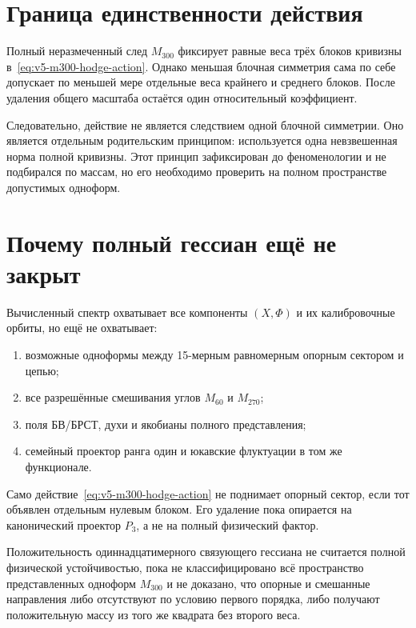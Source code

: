 \section{Граница единственности действия}

Полный неразмеченный след $M_{300}$ фиксирует равные веса трёх блоков
кривизны в~\eqref{eq:v5-m300-hodge-action}. Однако меньшая блочная симметрия
сама по себе допускает по меньшей мере отдельные веса крайнего и среднего
блоков. После удаления общего масштаба остаётся один относительный
коэффициент.

Следовательно, действие не является следствием одной блочной симметрии.
Оно является отдельным родительским принципом: используется одна
невзвешенная норма полной кривизны. Этот принцип зафиксирован до
феноменологии и не подбирался по массам, но его необходимо проверить на
полном пространстве допустимых одноформ.

\section{Почему полный гессиан ещё не закрыт}

Вычисленный спектр охватывает все компоненты $(X,\Phi)$ и их калибровочные
орбиты, но ещё не охватывает:
\begin{enumerate}
 \item возможные одноформы между 15-мерным равномерным опорным сектором и
 цепью;
 \item все разрешённые смешивания углов $M_{60}$ и $M_{270}$;
 \item поля БВ/БРСТ, духи и якобианы полного представления;
 \item семейный проектор ранга один и юкавские флуктуации в том же
 функционале.
\end{enumerate}
Само действие~\eqref{eq:v5-m300-hodge-action} не поднимает опорный сектор,
если тот объявлен отдельным нулевым блоком. Его удаление пока опирается на
канонический проектор $P_3$, а не на полный физический фактор.

\begin{nogocriterion}
Положительность одиннадцатимерного связующего гессиана не считается полной
физической устойчивостью, пока не классифицировано всё пространство
представленных одноформ $M_{300}$ и не доказано, что опорные и смешанные
направления либо отсутствуют по условию первого порядка, либо получают
положительную массу из того же квадрата без второго веса.
\end{nogocriterion}

